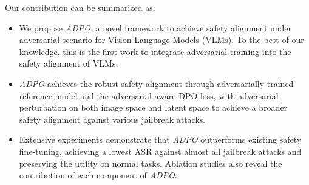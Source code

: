 Our contribution can be summarized as:
\begin{itemize}[leftmargin=15pt, itemsep=2pt, parsep=0pt, partopsep=0pt, topsep=0pt] 
\item We propose \textit{ADPO}, a novel framework to achieve safety alignment under adversarial scenario for Vision-Language Models (VLMs). To the best of our knowledge, this is the first work to integrate adversarial training into the safety alignment of VLMs.

\item \textit{ADPO} achieves the robust safety alignment through adversarially trained reference model and the adversarial-aware DPO loss, with adversarial perturbation on both image space and latent space to achieve a broader safety alignment against various jailbreak attacks.




\item Extensive experiments demonstrate that \textit{ADPO} outperforms existing safety fine-tuning, achieving a lowest ASR against almost all jailbreak attacks and preserving the utility on normal tasks. Ablation studies also reveal the contribution of each component of \textit{ADPO}. 


\end{itemize}



